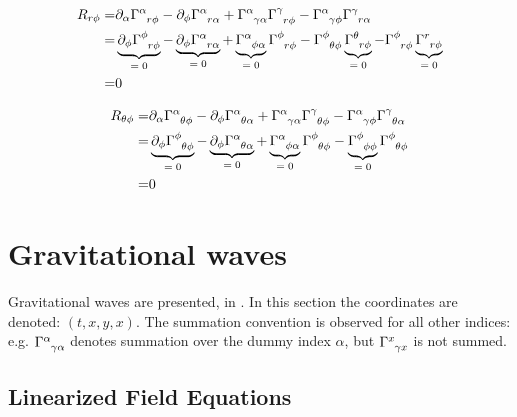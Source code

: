 \documentclass[]{article}
\begin{document}
\begin{align*}
	R_{r\phi} =& \partial_\alpha \Gamma\indices{^\alpha_{r\phi}} - \partial_\phi \Gamma\indices{^\alpha_{r\alpha}} + \Gamma\indices{^\alpha_{\gamma\alpha}} \Gamma\indices{^\gamma_{r\phi}} - \Gamma\indices{^\alpha_{\gamma\phi}} \Gamma\indices{^\gamma_{r\alpha}}\\
	=& \underbrace{\partial_\phi \Gamma\indices{^\phi_{r\phi}}}_\text{$=0$} - \underbrace{\partial_\phi \Gamma\indices{^\alpha_{r\alpha}}}_\text{$=0$} + \underbrace{\Gamma\indices{^\alpha_{\phi\alpha}}}_\text{$=0$} \Gamma\indices{^\phi_{r\phi}} - \Gamma\indices{^\phi_{\theta\phi}} \underbrace{\Gamma\indices{^\theta_{r\phi}}}_\text{$=0$} - \Gamma\indices{^\phi_{r\phi}} \underbrace{\Gamma\indices{^r_{r\phi}}}_\text{$=0$}\\
	=&0
\end{align*}

\begin{align*}
	R_{\theta\phi} =& \partial_\alpha \Gamma\indices{^\alpha_{\theta\phi}} - \partial_\phi \Gamma\indices{^\alpha_{\theta\alpha}} + \Gamma\indices{^\alpha_{\gamma\alpha}} \Gamma\indices{^\gamma_{\theta\phi}} - \Gamma\indices{^\alpha_{\gamma\phi}} \Gamma\indices{^\gamma_{\theta\alpha}}\\
	=& \underbrace{\partial_\phi \Gamma\indices{^\phi_{\theta\phi}}}_\text{$=0$} - \underbrace{\partial_\phi \Gamma\indices{^\alpha_{\theta\alpha}}}_\text{$=0$} + \underbrace{\Gamma\indices{^\alpha_{\phi\alpha}}}_\text{$=0$} \Gamma\indices{^\phi_{\theta\phi}} - \underbrace{\Gamma\indices{^\phi_{\phi\phi}}}_\text{$=0$} \Gamma\indices{^\phi_{\theta\phi}}\\
	=&0
\end{align*}

\section{Gravitational waves}\label{sec:gravitational:waves}

Gravitational waves are presented, in \cite[Lecture 10]{susskind2012general}.
In this section the coordinates are denoted: $(t,x,y,x)$. The summation convention is observed for all other indices: e.g. $\Gamma\indices{^\alpha_{\gamma\alpha}}$ denotes summation over the dummy index $\alpha$, but $\Gamma\indices{^x_{\gamma x}}$ is not summed.
\subsection{Linearized Field Equations}
\end{document}
